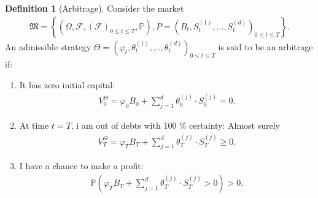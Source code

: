 \documentclass{article}
\theoremstyle{definition}
\newtheorem{definition}[theorem]{Definition}
\numberwithin{equation}{section}
\begin{document}
\begin{definition}[Arbitrage]
    Consider the market
    \begin{align}
        \mathfrak{M} =
        \left\{
            \left(
                \Omega, 
                \mathscr{F}, 
                \left(
                    \mathscr{F}
                \right)_{0 \leq t \leq T},
                \mathbb{P}
            \right),
            P =
            \left(
                B_t,
                S_t^{(1)},
                \ldots,
                S_t^{(d)}
            \right)_{0 \leq t \leq T}
        \right\}.
    \end{align}
    An admissible strategy $\Theta = \left(\varphi_t, \theta_t^{(1)}, \ldots, \theta_t^{(d)}\right)_{0 \leq t \leq T}$ is said to be an arbitrage if:
    \begin{enumerate}
        \item It has zero initial capital:
        \begin{align}
            V_0^\Theta = \varphi_0B_0 + \sum_{j = 1}^d\theta_0^{(j)} \cdot S_0^{(j)} = 0.
        \end{align}
        \item At time $t = T$, i am out of debts with 100 \% certainty: Almost surely
        \begin{align}
            V_T^\Theta = \varphi_T B_T + \sum_{j = 1}^d\theta_T^{(j)} \cdot S_T^{(j)} \geq 0.
        \end{align}
        \item I have a chance to make a profit:
        \begin{align}
            \mathbb{P}
            \left(
                \varphi_TB_T + \sum_{j = 1}^d \theta_T^{(j)} \cdot S_T^{(j)} > 0
            \right) > 0.
        \end{align}
    \end{enumerate}
\end{definition}
\end{document}

